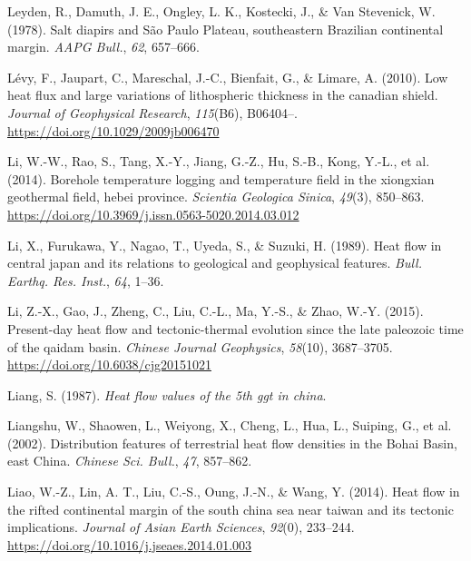 \documentclass[draft,linenumbers]{agujournal2018}
\begin{document}
\leavevmode{}%
Leyden, R., Damuth, J. E., Ongley, L. K., Kostecki, J., \& Van
Stevenick, W. (1978). Salt diapirs and {S{ã}o Paulo Plateau},
southeastern {Brazilian} continental margin. \emph{AAPG Bull.},
\emph{62}, 657--666.

\leavevmode{}%
Lévy, F., Jaupart, C., Mareschal, J.-C., Bienfait, G., \& Limare, A.
(2010). Low heat flux and large variations of lithospheric thickness in
the canadian shield. \emph{Journal of Geophysical Research},
\emph{115}(B6), B06404--. \url{https://doi.org/10.1029/2009jb006470}

\leavevmode{}%
Li, W.-W., Rao, S., Tang, X.-Y., Jiang, G.-Z., Hu, S.-B., Kong, Y.-L.,
et al. (2014). Borehole temperature logging and temperature field in the
xiongxian geothermal field, hebei province. \emph{Scientia Geologica
Sinica}, \emph{49}(3), 850--863.
\url{https://doi.org/10.3969/j.issn.0563-5020.2014.03.012}

\leavevmode{}%
Li, X., Furukawa, Y., Nagao, T., Uyeda, S., \& Suzuki, H. (1989). Heat
flow in central japan and its relations to geological and geophysical
features. \emph{Bull. Earthq. Res. Inst.}, \emph{64}, 1--36.

\leavevmode{}%
Li, Z.-X., Gao, J., Zheng, C., Liu, C.-L., Ma, Y.-S., \& Zhao, W.-Y.
(2015). Present-day heat flow and tectonic-thermal evolution since the
late paleozoic time of the qaidam basin. \emph{Chinese Journal
Geophysics}, \emph{58}(10), 3687--3705.
\url{https://doi.org/10.6038/cjg20151021}

\leavevmode{}%
Liang, S. (1987). \emph{Heat flow values of the 5th ggt in china}.

\leavevmode{}%
Liangshu, W., Shaowen, L., Weiyong, X., Cheng, L., Hua, L., Suiping, G.,
et al. (2002). Distribution features of terrestrial heat flow densities
in the {Bohai Basin, east China}. \emph{Chinese Sci. Bull.}, \emph{47},
857--862.

\leavevmode{}%
Liao, W.-Z., Lin, A. T., Liu, C.-S., Oung, J.-N., \& Wang, Y. (2014).
Heat flow in the rifted continental margin of the south china sea near
taiwan and its tectonic implications. \emph{Journal of Asian Earth
Sciences}, \emph{92}(0), 233--244.
\url{https://doi.org/10.1016/j.jseaes.2014.01.003}
\end{document}
